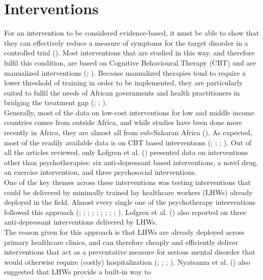 \documentclass[stu,a4paper,12pt,donotrepeattitle]{apa7}
\begin{document}
\section{Interventions}
For an intervention to be considered evidence-based, it must be able to show
that they can effectively reduce a measure of symptoms for the target disorder
in a controlled trial (\cite{cook17}). Most interventions that are studied in
this way, and therefore fulfil this condition, are based on Cognitive
Behavioural Therapy (CBT) and are manualized interventions
(\cite{cook17}; \cite{shed18}). Because manualized therapies tend to require a
lower threshold of training in order to be implemented, they are particularly
suited to fulfil the needs of African governments and health practitioners in
bridging the treatment gap (\cite{cook17}; \cite{douketal21}; \cite{lunetal14}).\\
Generally, most of the data on low-cost interventions for low and middle income
countries comes from outside Africa, and while studies have been done more
recently in Africa, they are almost all from sub-Saharan Africa
(\cite{logetal18}). As expected, most of the readily available data is on
CBT based interventions (\cite{chibandaetal11}; \cite{fernaetal21};
\cite{logetal18}; \cite{lunetal14}). Out of all the articles reviewed, only
Lofgren et al. (\citeyear{logetal18}) presented data on interventions other than
psychotherapies: six anti-depressant based interventions, a novel drug, an
exercise intervention, and three psychosocial interventions.\\
One of the key themes across these interventions was testing interventions that
could be delivered by minimally trained lay healthcare workers (LHWs) already
deployed in the field. Almost every single one of the psychotherapy interventions
followed this approach (\cite{abasal16}; \cite{chibandaetal11};
\cite{chibandaetal15}; \cite{chibandaetal16}; \cite{douketal21};
\cite{fernaetal21}; \cite{logetal18}; \cite{lunetal14}; \cite{nyatetal16};
\cite{petersenetal14}). Lofgren et al. (\citeyear{logetal18}) also reported on
three anti-depressant interventions delivered by LHWs.\\
The reason given for this approach is that LHWs are already deployed across
primary healthcare clinics, and can therefore cheaply and efficiently deliver
interventions that act as a preventative measure for serious mental disorder
that would otherwise require (costly) hospitalization (\cite{abasal16};
\cite{douketal21}; \cite{fernaetal21}; \cite{lunetal14}). Nyatsanza et al.
(\citeyear{nyatetal16}) also suggested that LHWs provide a built-in way to
\end{document}
